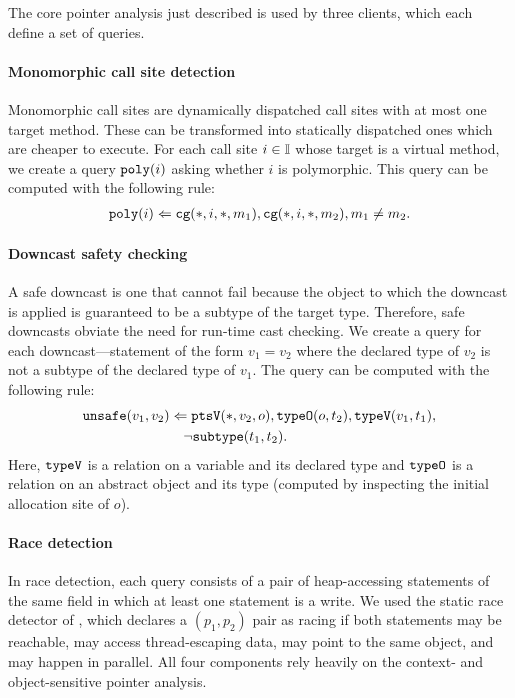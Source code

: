 
The core pointer analysis just described is used by three clients, which each
define a set of queries.

\paragraph{Monomorphic call site detection}

Monomorphic call sites are dynamically dispatched call sites with at most one
target method.  These can be transformed into statically dispatched ones which
are cheaper to execute.
For each call site $i \in {\mathbb I}$ whose target is a virtual method,
we create a query $\text{\tt poly}(i)$ asking whether $i$ is polymorphic.
This query can be computed with the following rule:
\begin{align}
\text{\tt poly}(i) \Leftarrow \text{\tt cg}(*,i,*,m_1), \text{\tt cg}(*,i,*,m_2), m_1 \neq m_2.
\end{align}

\paragraph{Downcast safety checking}

A safe downcast is one that cannot fail because the object to which the
downcast is applied is guaranteed to be a subtype of the target type.
Therefore, safe downcasts obviate the need for run-time cast checking.
We create a query for each downcast---statement of the form $v_1 = v_2$ where the
declared type of $v_2$ is not a subtype of the declared type of $v_1$.
The query can be computed with the following rule:
\begin{align}
& \text{\tt unsafe}(v_1,v_2) \Leftarrow \text{\tt ptsV}(*,v_2,o), \text{\tt typeO}(o,t_2), \text{\tt typeV}(v_1,t_1), \nonumber \\
& \hspace{1in} \neg\text{\tt subtype}(t_1,t_2).
\end{align}
Here, $\text{\tt typeV}$ is a relation on a variable and its declared type
and $\text{\tt typeO}$ is a relation on an abstract object and its type
(computed by inspecting the initial allocation site of $o$).

\paragraph{Race detection}

In race detection, each query consists of a pair of heap-accessing statements
of the same field in which at least one statement is a write.  We used the
static race detector of \cite{NaikAikenWhaley2006}, which declares a
$(p_1,p_2)$ pair as racing if both statements may be reachable, may access
thread-escaping data, may point to the same object, and may happen in parallel.
All four components rely heavily on the context- and object-sensitive pointer
analysis.

